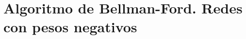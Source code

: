 \documentclass[aspectratio=169]{beamer}
\begin{document}

\section{Algoritmo de Bellman-Ford. Redes con pesos negativos}
\end{document}
